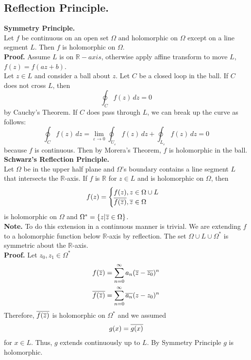 \documentclass[11pt]{article}
\begin{document}
\subsection{Reflection Principle.}
\textbf{Symmetry Principle.} \\
Let $f$ be continuous on an open set $\Omega$ and holomorphic on $\Omega$ except on a line segment $L$. Then $f$ is holomorphic on $\Omega$. \\
\textbf{Proof.} 
Assume $L$ is on $\mathbb{R}-axis$, otherwise apply affine transform to move $L$, $f(z) = f(az + b)$. \\
Let $z \in L$ and consider a ball about $z$. Let $C$ be a closed loop in the ball. If $C$ does not cross $L$, then 
$$\oint_C f(z) \, dz = 0$$ 
by Cauchy's Theorem. If $C$ does pass through $L$, we can break up the curve as follows: 
$$ \oint_Cf(z)\,dz = \lim_{\varepsilon \to 0} \oint_{U_\varepsilon} f(z) \, dz + \oint_{L_\varepsilon} f(z) \, dz = 0$$
because $f$ is continuous. Then by Morera's Theorem, $f$ is holomorphic in the ball. \\
\newline
\textbf{Schwarz's Reflection Principle.} \\
Let $\Omega$ be in the upper half plane and $\Omega$'s boundary contains a line segment $L$ that intersects the $\mathbb{R}$-axis. If $f$ is $\mathbb{R}$ for $z \in L$ and is holomorphic on $\Omega$, then 
$$
f(z) = 
\begin{cases} 
	f(z), z \in \Omega \cup L \\
	\overline{f(\overline{z})}, \overline{z} \in \Omega \\
\end{cases}
$$
is holomorphic on $\Omega$ and $\Omega^\ast = \{z|\overline{z} \in \Omega \}$. \\
\textbf{Note.} To do this extension in a continuous manner is trivial. We are extending $f$ to a holomorphic function below $\mathbb{R}$-axis by reflection. The set $\Omega \cup L \cup \Omega^\ast$ is symmetric about the $\mathbb{R}$-axis. \\
\textbf{Proof.} Let $z_0, z_1 \in \Omega^\ast$ 
\begin{align*}
f(\overline{z}) &= \sum_{n = 0}^{\infty}a_n(\overline{z} - \overline{z_0})^n \\
\overline{f(\overline{z})} &= \sum_{n = 0}^{\infty} \overline{a_n}(z - z_0)^n
\end{align*}
Therefore, $\overline{f(\overline{z})}$ is holomorphic on $\Omega^\ast$ and we assumed 
$$g(x) = \overline{g(x)}$$
for $x \in L$. Thus, $g$ extends continuously up to $L$. By Symmetry Principle $g$ is holomorphic. \\
\end{document}
